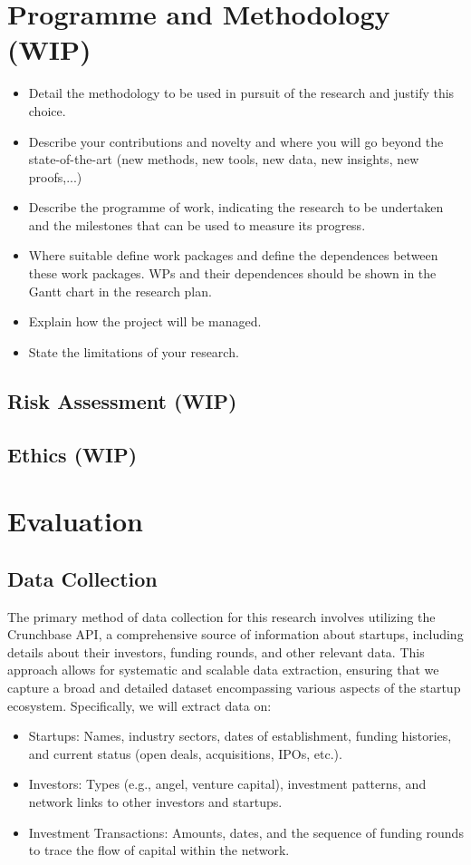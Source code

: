 \documentclass[a4paper,11pt]{article}
\begin{document}
\section{Programme and Methodology (WIP)}

\begin{itemize}
    \item Detail the methodology to be used in pursuit of the research and justify this choice.
    \item Describe your contributions and novelty and where you
    will go beyond the state-of-the-art (new methods, new tools,
    new data, new insights, new proofs,...)
    \item Describe the programme of work, indicating the research to be undertaken and the milestones that can be used to measure its progress.
    \item Where suitable define work packages and define the dependences
    between these work packages. WPs and their dependences should be
    shown in the Gantt chart in the research plan.
    \item Explain how the project will be managed.
    \item State the limitations of your research.
\end{itemize}

\subsection{Risk Assessment (WIP)}

\subsection{Ethics (WIP)}


\section{Evaluation}
\subsection{Data Collection}
The primary method of data collection for this research involves utilizing the Crunchbase API, a comprehensive source of information about startups, including details about their investors, funding rounds, and other relevant data. This approach allows for systematic and scalable data extraction, ensuring that we capture a broad and detailed dataset encompassing various aspects of the startup ecosystem. Specifically, we will extract data on:
\begin{itemize}
    \item Startups: Names, industry sectors, dates of establishment, funding histories, and current status (open deals, acquisitions, IPOs, etc.).
    \item Investors: Types (e.g., angel, venture capital), investment patterns, and network links to other investors and startups.
    \item Investment Transactions: Amounts, dates, and the sequence of funding rounds to trace the flow of capital within the network.
\end{itemize}
\end{document}
